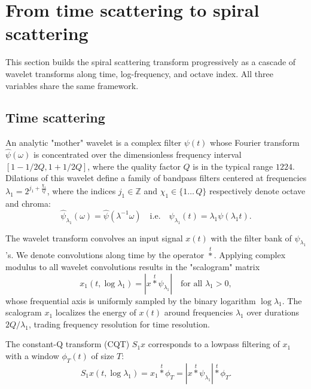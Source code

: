 \documentclass[twoside,a4paper]{article}
\begin{document}
\section{From time scattering to spiral scattering}
This section builds the spiral scattering transform progressively as a cascade of wavelet transforms along time, log-frequency, and octave index. All three variables share the same framework.



\subsection{Time scattering}

An analytic "mother" wavelet is a complex filter $\psi(t)$
whose Fou\-rier transform $\widehat{\psi}(\omega)$ is concentrated over the
dimensionless frequency interval $[1-1/2Q,1+1/2Q]$, where the quality factor $Q$ is in the typical range $12$\textendash$24$. Dilations of this wavelet
define a family of bandpass filters centered at frequencies
$ \lambda_{1} = 2^{j_{1} + \frac{\chi_{1}}{Q}}$,
where the indices $j_{1} \in \mathbb{Z}$ and $\chi_{1} \in \{1\ldots\,Q\}$ respectively denote octave and chroma:
\begin{equation}
    \widehat{\psi}_{\lambda_{1}}(\omega) = \widehat{\psi}(\lambda^{-1}\omega)
    \quad\mathrm{i.e.}\quad
    \psi_{\lambda_{1}}(t)=\lambda_{1}\psi(\lambda_{1}t).
\label{eq:wavelet-dilations}
\end{equation}

The wavelet transform convolves an input signal $x(t)$ with the filter bank of $\psi_{\lambda_1}$'s. We denote convolutions along time by the operator $\overset{t}{\ast}$. Applying complex modulus to all wavelet convolutions results in the "scalogram" matrix
\begin{equation}
    x_1(t, \log \lambda_1) =
    |x \overset{t}{\ast} \psi_{\lambda_1}| \quad \text{for all } \lambda_1 > 0,
\label{eq:scalogram}
\end{equation}
whose frequential axis is uniformly sampled by the binary logarithm $\log \lambda_1$. The scalogram $x_1$ localizes the energy of $x(t)$ around frequencies $\lambda_1$ over durations $2 Q / \lambda_1$, trading frequency resolution for time resolution.

The constant-Q transform (CQT) $S_1 x$ corresponds to a lowpass filtering of $x_1$ with a window $\phi_T(t)$ of size $T$:
\begin{equation}
S_1 x (t, \log \lambda_1) =
x_1 \overset{t}{\ast} \phi_T =
| x \overset{t}{\ast} \psi_{\lambda_{1}} | \overset{t}{\ast} \phi_T.
\label{eq:S1}
\end{equation}
\end{document}
